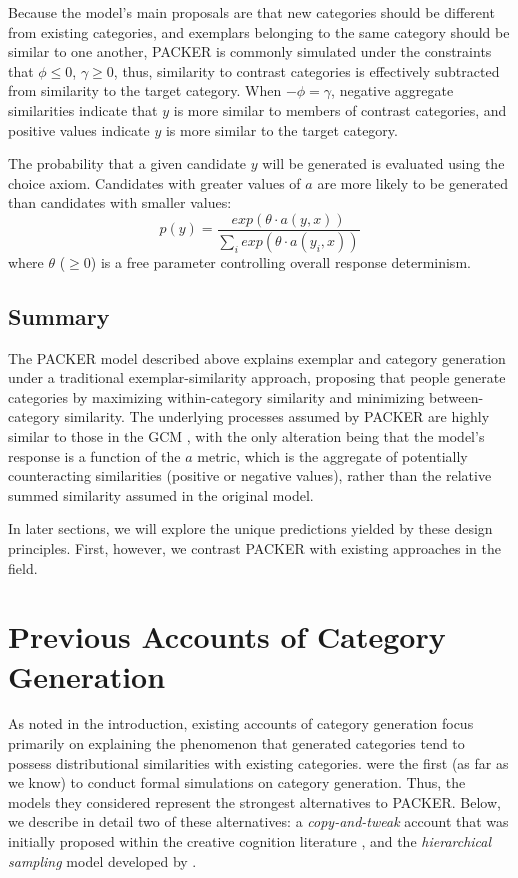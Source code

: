 \documentclass[10pt,letterpaper]{article}
\begin{document}
Because the model's main proposals are that new categories should be different from existing categories, and exemplars belonging to the same category should be similar to one another, PACKER is commonly simulated under the constraints that $\phi \leq 0$, $\gamma \geq 0$, thus, similarity to contrast categories is effectively subtracted from similarity to the target category. When $-\phi = \gamma$, negative aggregate similarities indicate that $y$ is more similar to members of contrast categories, and positive values indicate $y$ is more similar to the target category.

The probability that a given candidate $y$ will be generated is evaluated using the \citet{luce1977choice} choice axiom. Candidates with greater values of $a$ are more likely to be generated than candidates with smaller values:
\begin{equation}
p(y) = \dfrac
    { exp( { \theta \cdot a(y, x) } ) }
    { \sum_i{ exp( { \theta \cdot a(y_i, x) } ) } }
    \label{eq:packer-choice}
\end{equation}
where $\theta$ ($\geq 0$) is a free parameter controlling overall response determinism. 

\subsection{Summary}

The PACKER model described above explains exemplar and category generation under a traditional exemplar-similarity approach, proposing that people generate categories by maximizing within-category similarity and minimizing between-category similarity. The underlying processes assumed by PACKER are highly similar to those in the GCM \citep{nosofsky1984choice}, with the only alteration being that the model's response is a function of the $a$ metric, which is the aggregate of potentially counteracting similarities (positive or negative values), rather than the relative summed similarity assumed in the original model.

In later sections, we will explore the unique predictions yielded by these design principles. First, however, we contrast PACKER with existing approaches in the field. 


\section{Previous Accounts of Category Generation}

As noted in the introduction, existing accounts of category generation focus primarily on explaining the phenomenon that generated categories tend to possess distributional similarities with existing categories. \citet{jern2013probabilistic} were the first (as far as we know) to conduct formal simulations on category generation. Thus, the models they considered represent the strongest alternatives to PACKER. Below, we describe in detail two of these alternatives: a \textit{copy-and-tweak} account that was initially proposed within the creative cognition literature \citep{ward2002role,ward1995s}, and the \textit{hierarchical sampling} model developed by \citet{jern2013probabilistic}.
\end{document}
